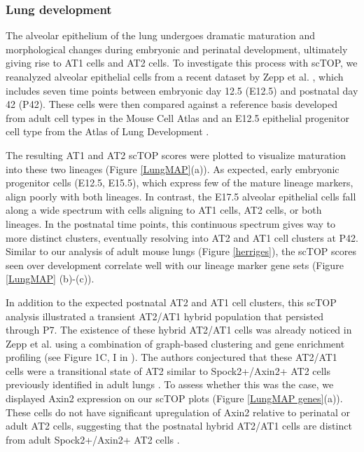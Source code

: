 \documentclass[aps,superscriptaddress, notitlepage,longbibliography]{revtex4-1}
\begin{document}
\subsubsection{Lung development}
The alveolar epithelium of the lung undergoes dramatic maturation and morphological changes during embryonic and perinatal development, ultimately giving rise to AT1 cells and AT2 cells. To investigate this process with scTOP, we reanalyzed alveolar epithelial cells from a recent dataset by Zepp et al. \cite{zepp2021genomic}, which includes seven time points between embryonic day 12.5 (E12.5) and postnatal day 42 (P42). These cells were then compared against a reference basis developed from adult cell types in the Mouse Cell Atlas and an E12.5 epithelial progenitor cell type from the Atlas of Lung Development  \cite{negretti_single-cell_2021}.

The resulting AT1 and AT2 scTOP scores were plotted to visualize maturation into these two lineages (Figure \ref{LungMAP}(a)). As expected, early embryonic progenitor cells (E12.5, E15.5), which express few of the mature lineage markers, align poorly with both lineages. In contrast, the E17.5 alveolar epithelial cells fall along a wide spectrum with cells aligning to AT1 cells, AT2 cells, or both lineages. In the postnatal time points, this continuous spectrum gives way to more distinct clusters, eventually resolving into AT2 and AT1 cell clusters at P42. Similar to our analysis of adult mouse lungs (Figure \ref{herriges}), the scTOP scores seen over development correlate well with our lineage marker gene sets (Figure \ref{LungMAP} (b)-(c)).

In addition to the expected postnatal AT2 and AT1 cell clusters, this scTOP analysis illustrated a transient AT2/AT1 hybrid population that persisted through P7. The existence of these hybrid AT2/AT1 cells was already noticed in Zepp et al. using a combination of graph-based clustering and gene enrichment profiling (see Figure 1C, I in \cite{zepp2021genomic}). The authors conjectured that these AT2/AT1 cells were a transitional state of AT2 similar to Spock2+/Axin2+ AT2 cells previously identified in adult lungs \cite{frank2016emergence}. To assess whether this was the case, we displayed Axin2 expression on our scTOP plots (Figure \ref{LungMAP genes}(a)). These cells do not have significant upregulation of Axin2 relative to perinatal or adult AT2 cells, suggesting that the postnatal hybrid AT2/AT1 cells are distinct from adult Spock2+/Axin2+ AT2 cells \cite{frank2016emergence}.
\end{document}
